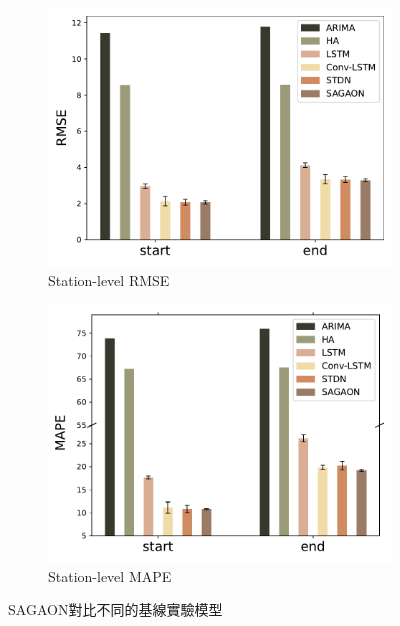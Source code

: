 \documentclass[a4paper,12pt]{extarticle}
\begin{document}
                \begin{figure}[htb]
                    \centering
                    \begin{subfigure}{.5\columnwidth}
                        \centering
                        \includegraphics[width=\linewidth]{station_level_RMSE.pdf}
                        \caption{
                            Station-level RMSE
                        }
                    \end{subfigure}%
                    \hfill
                    \begin{subfigure}{.5\columnwidth}
                        \centering
                        \includegraphics[width=\linewidth]{station_level_MAPE.pdf}
                        \caption{ 
                            Station-level MAPE
                        }
                    \end{subfigure}%
                    \caption{
                        SAGAON對比不同的基線實驗模型
                    }
                    \label{fig:comparison}
                \end{figure}
\end{document}
